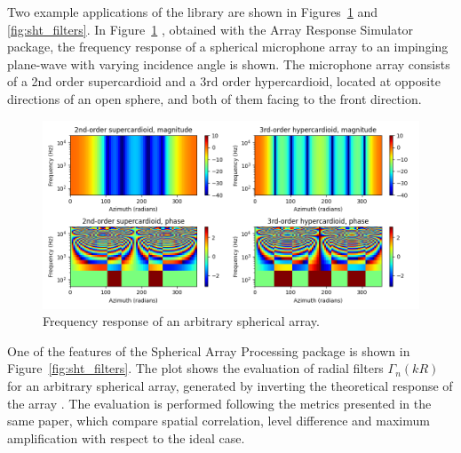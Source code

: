Two example applications of the library are shown in Figures~\ref{fig:array_response} and \ref{fig:sht_filters}.
In Figure~\ref{fig:array_response} , obtained with the Array Response Simulator package, the frequency response of a spherical microphone array to an impinging plane-wave with varying incidence angle is shown. The microphone array consists of a 2nd order supercardioid and a 3rd order hypercardioid, located at opposite directions of an open sphere, and both of them facing to the front direction. \\

\begin{figure}[h!]
\label{fig_architecture}
  \centering
    \includegraphics[width=\textwidth]{Figures/DataGeneration/array_response.png}
    \caption{Frequency response of an arbitrary spherical array.}
    \label{fig:array_response}
\end{figure}


One of the features of the Spherical Array Processing package is shown in Figure~\ref{fig:sht_filters}. The plot shows the evaluation of radial filters $\Gamma_n(kR)$ for an arbitrary spherical array, generated by inverting the theoretical response of the array \cite{Bertet2006}. 
The evaluation is performed following the metrics presented in the same paper, which compare spatial correlation, level difference and maximum amplification with respect to the ideal case. \\


